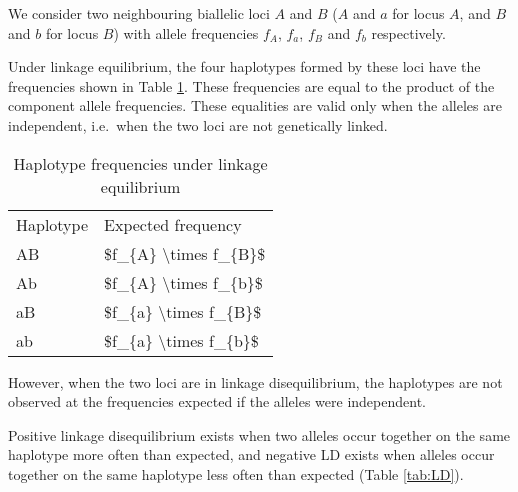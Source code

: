 \documentclass[]{book}
\begin{document}
We consider two neighbouring biallelic loci \(A\) and \(B\) (\(A\) and \(a\) for
locus \(A\), and \(B\) and \(b\) for locus \(B\)) with allele frequencies
\(f_{A}\), \(f_{a}\), \(f_{B}\) and \(f_{b}\) respectively.

Under linkage equilibrium, the four haplotypes formed by these loci have
the frequencies shown in Table \ref{tab:LE}. These frequencies are equal
to the product of the component allele frequencies. These equalities are
valid only when the alleles are independent, i.e.~when the two loci are
not genetically linked.

\begin{table}

\caption{\label{tab:LE}Haplotype frequencies under linkage equilibrium}
\centering
\begin{tabular}[t]{ll}
\toprule
Haplotype & Expected frequency\\
AB & \$f\_\{A\} \textbackslash{}times f\_\{B\}\$\\
Ab & \$f\_\{A\} \textbackslash{}times f\_\{b\}\$\\
aB & \$f\_\{a\} \textbackslash{}times f\_\{B\}\$\\
ab & \$f\_\{a\} \textbackslash{}times f\_\{b\}\$\\
\bottomrule
\end{tabular}
\end{table}

However, when the two loci are in linkage disequilibrium, the haplotypes
are not observed at the frequencies expected if the alleles were
independent.

Positive linkage disequilibrium exists when two alleles occur together
on the same haplotype more often than expected, and negative LD exists
when alleles occur together on the same haplotype less often than
expected (Table \ref{tab:LD}).
\end{document}
